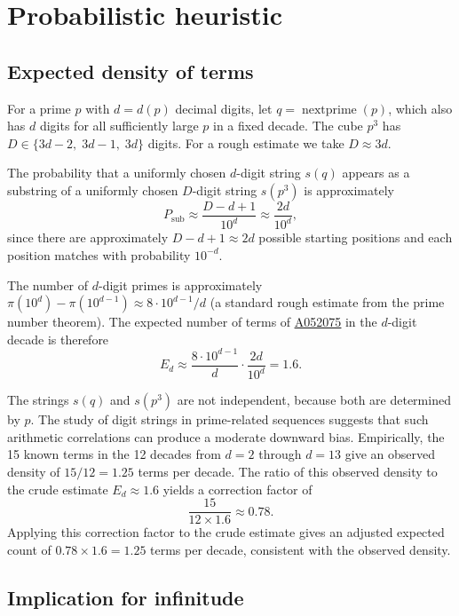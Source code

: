 \documentclass[12pt,reqno]{article}
\theoremstyle{plain}
\theoremstyle{definition}
\theoremstyle{remark}
\newcommand{\np}{\operatorname{nextprime}}
\newcommand{\seqnum}[1]{\href{https://oeis.org/#1}{\rm \underline{#1}}}
\begin{document}
\section{Probabilistic heuristic}
\label{sec:heuristic}

\subsection{Expected density of terms}
\label{sec:density}

For a prime $p$ with $d = d(p)$ decimal digits, let $q = \np(p)$,
which also has $d$ digits for all sufficiently large $p$ in a fixed
decade.
The cube $p^3$ has $D \in \{3d - 2,\; 3d - 1,\; 3d\}$ digits.
For a rough estimate we take $D \approx 3d$.

The probability that a uniformly chosen $d$-digit string $s(q)$
appears as a substring of a uniformly chosen $D$-digit string
$s(p^3)$ is approximately
\begin{equation}
P_{\mathrm{sub}} \approx \frac{D - d + 1}{10^d} \approx \frac{2d}{10^d},
\label{eq:psub}
\end{equation}
since there are approximately $D - d + 1 \approx 2d$ possible starting
positions and each position matches with probability $10^{-d}$.

The number of $d$-digit primes is approximately
$\pi(10^d) - \pi(10^{d-1}) \approx 8 \cdot 10^{d-1} / d$
(a standard rough estimate from the prime number theorem).
The expected number of terms of \seqnum{A052075} in the $d$-digit
decade is therefore
\begin{equation}
E_d \approx \frac{8 \cdot 10^{d-1}}{d} \cdot \frac{2d}{10^d} = 1.6.
\label{eq:Ed_raw}
\end{equation}

The strings $s(q)$ and $s(p^3)$ are not independent, because both are
determined by $p$.
The study of digit strings in prime-related sequences \cite{Dudek2014}
suggests that such arithmetic correlations can produce a moderate
downward bias.
Empirically, the 15 known terms in the 12 decades from $d = 2$ through
$d = 13$ give an observed density of $15/12 = 1.25$ terms per decade.
The ratio of this observed density to the crude estimate
$E_d \approx 1.6$ yields a correction factor of
\[
\frac{15}{12 \times 1.6} \approx 0.78.
\]
Applying this correction factor to the crude estimate gives an
adjusted expected count of $0.78 \times 1.6 = 1.25$ terms per
decade, consistent with the observed density.

\subsection{Implication for infinitude}
\label{sec:infinitude}
\end{document}
